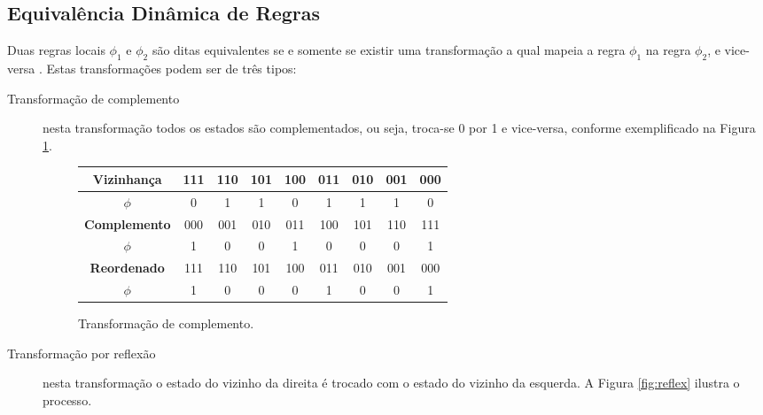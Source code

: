 \documentclass[12pt,a4paper]{article}
\begin{document}
\subsection{Equivalência Dinâmica de Regras}

Duas regras locais ${\phi}_1$ e ${\phi}_2$ são ditas equivalentes se e somente se existir
uma transformação a qual mapeia a regra ${\phi}_1$ na regra ${\phi}_2$, e vice-versa
. Estas transformações podem ser de três tipos:

\begin{description}

\item[Transformação de complemento] nesta transformação todos os estados são complementados,
ou seja, troca-se 0 por 1 e vice-versa, conforme exemplificado na Figura \ref{fig:complement}.

\begin{figure}[htp]
\begin{center}
\begin{tabular}{|c|c|c|c|c|c|c|c|c|}
\hline
\Large \textbf{Vizinhança}  & 111 & 110 & 101 & 100 & 011 & 010 & 001 & 000 \\ \hline
\Large \textbf{$\phi$}      &  0  &  1  &  1  &  0  &  1  &  1  &  1  &  0  \\ \hline
\hline
\Large \textbf{Complemento} & 000 & 001 & 010 & 011 & 100 & 101 & 110 & 111 \\ \hline
\Large \textbf{$\phi$}      &  1  &  0  &  0  &  1  &  0  &  0  &  0  &  1  \\ \hline
\hline
\Large \textbf{Reordenado}  & 111 & 110 & 101 & 100 & 011 & 010 & 001 & 000 \\ \hline
\Large \textbf{$\phi$}      &  1  &  0  &  0  &  0  &  1  &  0  &  0  &  1  \\ \hline
\end{tabular}
\caption{Transformação de complemento.}
\label{fig:complement}
\end{center}
\end{figure}

\item[Transformação por reflexão] nesta transformação o estado do vizinho da direita é
trocado com o estado do vizinho da esquerda. A Figura \ref{fig:reflex} ilustra o processo.


\end{description}
\end{document}
